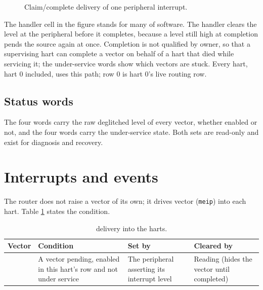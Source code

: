 \begin{figure}[htpb]
	\centering
	
	\caption{Claim/complete delivery of one peripheral interrupt.}
	\label{fig:irq-claim-complete}
\end{figure}

The handler cell in the figure stands for many  of software. The handler clears the level at the peripheral before it completes, because a level still high at completion pends the source again at once. Completion is not qualified by owner, so that a supervising hart can complete a vector on behalf of a hart that died while servicing it; the under-service words show which vectors are stuck. Every hart, hart 0 included, uses this path; row 0 is hart 0's live routing row.

\subsection{Status words}

The four  words carry the raw deglitched level of every vector, whether enabled or not, and the four  words carry the under-service state. Both sets are read-only and exist for diagnosis and recovery.

\section{Interrupts and events}

The router does not raise a vector of its own; it drives vector \MeipVector{} (\texttt{meip}) into each hart. Table \ref{t:irqrouter-irq} states the condition.

\begin{table}[htb]
	\centering
	\caption{ delivery into the harts.}
	\label{t:irqrouter-irq}
	\begin{tabular}{ l p{4.4cm} p{3.8cm} p{4.6cm} }
	\textbf{Vector} & \textbf{Condition} & \textbf{Set by} & \textbf{Cleared by} \\ \hline
	\MeipVector{} & A vector pending, enabled in this hart's row and not under service & The peripheral asserting its interrupt level & Reading \register{CLAIM} (hides the vector until completed) \\
	\hline
	\end{tabular}
\end{table}

